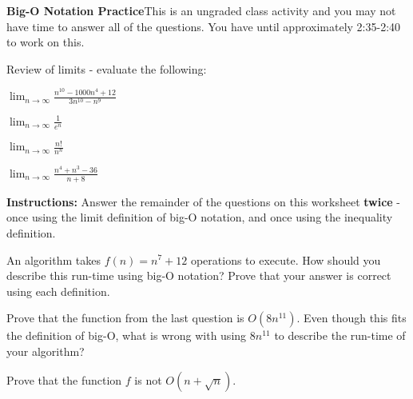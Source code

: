 \documentclass{article}
\theoremstyle{definition}
\numberwithin{equation}{section}
\begin{document}
\noindent\textbf{Big-O Notation Practice}\newline This is an ungraded class activity and you may not have time to answer all of the questions. You have until approximately 2:35-2:40 to work on this.

\vspace{0.4in}

\noindent Review of limits - evaluate the following:

\vspace{0.2in}

$\lim_{n\to\infty}\frac{n^{10}-1000n^4+12}{3n^{10}-n^9}$

\vfill

$\lim_{n\to\infty}\frac{1}{e^n}$

\vfill

$\lim_{n\to\infty}\frac{n!}{n^n}$

\vfill

$\lim_{n\to\infty}\frac{n^4+n^3-36}{n+8}$

\vfill

\noindent \textbf{Instructions:} Answer the remainder of the questions on this worksheet \textbf{twice} - once using the limit definition of big-O notation, and once using the inequality definition.

\vspace{0.2in}

An algorithm takes $f(n)=n^7+12$ operations to execute. How should you describe this run-time using big-O notation? Prove that your answer is correct using each definition.

\vspace{0.4in}

\vfill

\newpage

Prove that the function from the last question is $O(8n^{11})$. Even though this fits the definition of big-O, what is wrong with using $8n^{11}$ to describe the run-time of your algorithm?

\vfill

Prove that the function $f$ is not $O(n+\sqrt{n})$.

\vfill
\end{document}
